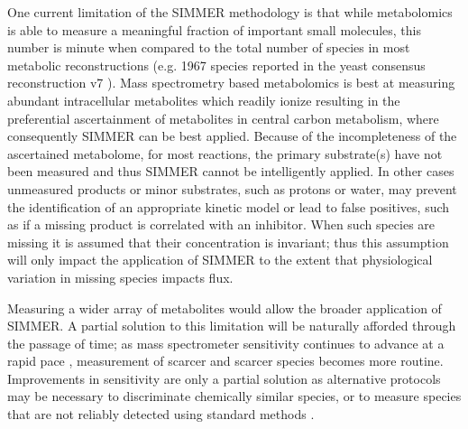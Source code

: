 One current limitation of the SIMMER methodology is that while metabolomics is able to measure a meaningful fraction of important small molecules, this number is minute when compared to the total number of species in most metabolic reconstructions (e.g. 1967 species reported in the yeast consensus reconstruction v7 \cite{BenjaminDHeavner:2013bp}). Mass spectrometry based metabolomics is best at measuring abundant intracellular metabolites which readily ionize resulting in the preferential ascertainment of metabolites in central carbon metabolism, where consequently SIMMER can be best applied. Because of the incompleteness of the ascertained metabolome, for most reactions, the primary substrate(s) have not been measured and thus SIMMER cannot be intelligently applied. In other cases unmeasured products or minor substrates, such as protons or water, may prevent the identification of an appropriate kinetic model or lead to false positives, such as if a missing product is correlated with an inhibitor.  When such species are missing it is assumed that their concentration is invariant; thus this assumption will only impact the application of SIMMER to the extent that physiological variation in missing species impacts flux.

Measuring a wider array of metabolites would allow the broader application of SIMMER. A partial solution to this limitation will be naturally afforded through the passage of time; as mass spectrometer sensitivity continues to advance at a rapid pace \cite{Radionova:2015gs}, measurement of scarcer and scarcer species becomes more routine. Improvements in sensitivity are only a partial solution as alternative protocols may be necessary to discriminate chemically similar species, or to measure species that are not reliably detected using standard methods \cite{Lammerhofer:2013tz}.

